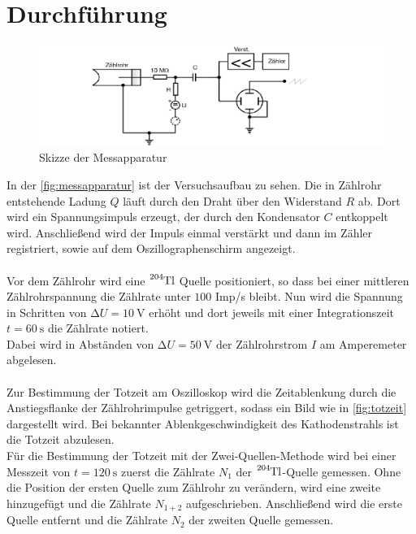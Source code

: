 \section{Durchführung}
\label{sec:Durchführung}
\begin{figure}
    \centering
    \includegraphics[width=\textwidth]{content/messapparatur.pdf}
    \caption{Skizze der Messapparatur \cite{anleitung}}
    \label{fig:messapparatur}
\end{figure}

In der \autoref{fig:messapparatur} ist der Versuchsaufbau zu sehen.
Die in Zählrohr entstehende Ladung $Q$ läuft durch den Draht über den Widerstand $R$ ab.
Dort wird ein Spannungsimpuls erzeugt, der durch den Kondensator $C$ entkoppelt wird.
Anschließend wird der Impuls einmal verstärkt und dann im Zähler registriert, sowie auf dem Oszillographenschirm angezeigt.\\
\\
Vor dem Zählrohr wird eine $\ce{^{204}Tl}$ Quelle positioniert, so dass bei einer mittleren Zählrohrspannung die Zählrate unter  $\num{100}$ Imp/s bleibt.
Nun wird die Spannung in Schritten von $\increment U = \SI{10}{\volt}$ erhöht und dort jeweils mit einer Integrationszeit $t=\SI{60}{\second}$ die Zählrate notiert.\\
Dabei wird in Abständen von $\increment U = \SI{50}{\volt}$ der Zählrohrstrom $I$ am Amperemeter abgelesen.\\
\\
Zur Bestimmung der Totzeit am Oszilloskop wird die Zeitablenkung durch die Anstiegsflanke der Zählrohrimpulse getriggert, sodass ein Bild wie in \autoref{fig:totzeit} dargestellt wird.
Bei bekannter Ablenkgeschwindigkeit des Kathodenstrahls ist die Totzeit abzulesen. \\
Für die Bestimmung der Totzeit mit der Zwei-Quellen-Methode wird bei einer Messzeit von $t=\SI{120}{\second}$ zuerst die Zählrate $N_1$ der $\ce{^{204}Tl}$-Quelle gemessen.
Ohne die Position der ersten Quelle zum Zählrohr zu verändern, wird eine zweite hinzugefügt und die Zählrate $N_{1+2}$ aufgeschrieben.
Anschließend wird die erste Quelle entfernt und die Zählrate $N_2$ der zweiten Quelle gemessen.